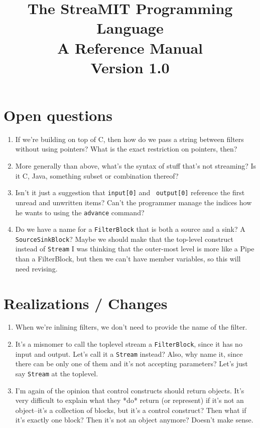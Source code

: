 \documentclass[draft]{article}
\title{The StreaMIT Programming Language \\ A Reference Manual \\ Version 1.0}
\begin{document}
\maketitle

\section{Open questions}

\begin{enumerate}

\item If we're building on top of C, then how do we pass a string
between filters without using pointers?  What is the exact restriction
on pointers, then?

\item More generally than above, what's the syntax of stuff that's not
streaming?  Is it C, Java, something subset or combination thereof?

\item Isn't it just a suggestion that {\tt input[0]} and {\tt
output[0]} reference the first unread and unwritten items?  Can't the
programmer manage the indices how he wants to using the {\tt advance}
command?

\item Do we have a name for a {\tt FilterBlock} that is both a source
and a sink?  A {\tt SourceSinkBlock}?  Maybe we should make that the
top-level construct instead of {\tt Stream} I was thinking that the
outer-most level is more like a Pipe than a FilterBlock, but then we
can't have member variables, so this will need revising.

\end{enumerate}

\section{Realizations / Changes}

\begin{enumerate}

\item When we're inlining filters, we don't need to provide the name
of the filter.

\item It's a misnomer to call the toplevel stream a {\tt FilterBlock},
since it has no input and output.  Let's call it a {\tt Stream}
instead?  Also, why name it, since there can be only one of them and
it's not accepting parameters?  Let's just say {\tt Stream} at the
toplevel.

\item I'm again of the opinion that control constructs should return
objects.  It's very difficult to explain what they *do* return (or
represent) if it's not an object--it's a collection of blocks, but
it's a control construct?  Then what if it's exactly one block?  Then
it's not an object anymore?  Doesn't make sense.

\end{enumerate}
\end{document}
